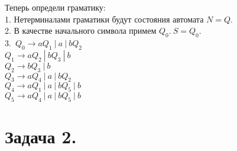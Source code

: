 \documentclass[12pt]{article}
\theoremstyle{definition}
\theoremstyle{definition}
\begin{document}
Теперь определи граматику: \\
1. Нетерминалами граматики будут состояния автомата $N = Q$.\\
2. В качестве начального символа примем $Q_0.\ S = Q_0.$\\
 3.\ $Q_0 \rightarrow aQ_1\ |\ a\ |\ bQ_2$\\
	\hspace*{0,5cm}$Q_1 \rightarrow aQ_2\ |\ bQ_3\ |\ b$ \\
	\hspace*{0,5cm}$Q_2 \rightarrow bQ_3\ |\ b$ \\
\hspace*{0,5cm}$Q_3 \rightarrow aQ_4\ |\ a\ |\ bQ_2$\\
\hspace*{0,5cm}$Q_4 \rightarrow aQ_1\ |\ a\ |\ bQ_5\ |\ b$\\
\hspace*{0,5cm}$Q_5 \rightarrow aQ_4\ |\ a\ |\ bQ_5\ |\ b$	\\



\section*{Задача  2.}
\end{document}
